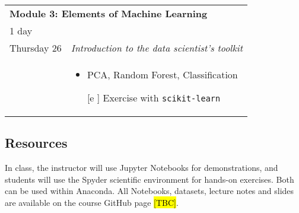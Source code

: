 \documentclass{amsart}
\theoremstyle{definition}
\theoremstyle{remark}
\numberwithin{equation}{section}
\begin{document}
\begin{center}
    \begin{tabular}{| p{3cm} | p{12cm} |}
    \hline
    \multicolumn{2}{|l|}{\textbf{Module 3: Elements of Machine Learning}} \\
    \multicolumn{2}{|l|}{1 day} \\
    \hline
    Thursday 26 & \textit{Introduction to the data scientist's toolkit} \\
        & \begin{itemize}
                \item PCA, Random Forest, Classification
                \item [[e]] Exercise with \texttt{scikit-learn}
            \end{itemize} \\
    \hline
    \end{tabular}

\end{center}

\begin{center}
    
\end{center}

\subsection*{Resources}

In class, the instructor will use Jupyter Notebooks for demonstrations, and students will use the Spyder scientific environment for hands-on exercises. Both can be used within Anaconda. All Notebooks, datasets, lecture notes and slides are available on the course GitHub page \hl{[TBC]}.

\newpage 



\end{document}
